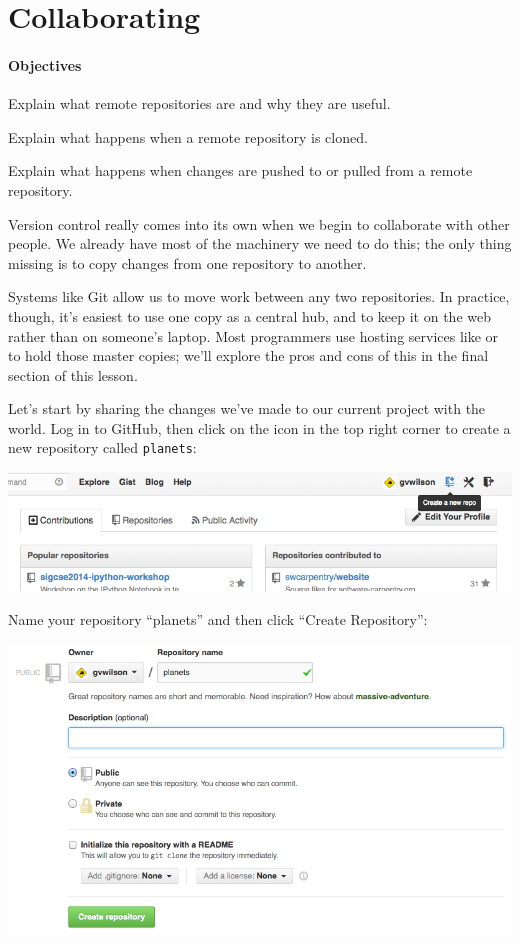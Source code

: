 \documentclass{book}
\begin{document}
\section{Collaborating}

\mbox{}\paragraph{Objectives}

\begin{swcitemize}
\item
  Explain what remote repositories are and why they are useful.
\item
  Explain what happens when a remote repository is cloned.
\item
  Explain what happens when changes are pushed to or pulled from a
  remote repository.
\end{swcitemize}

Version control really comes into its own when we begin to collaborate
with other people. We already have most of the machinery we need to do
this; the only thing missing is to copy changes from one repository to
another.

Systems like Git allow us to move work between any two repositories. In
practice, though, it's easiest to use one copy as a central hub, and to
keep it on the web rather than on someone's laptop. Most programmers use
hosting services like  or
 to hold those master copies;
we'll explore the pros and cons of this in the final section of this
lesson.

Let's start by sharing the changes we've made to our current project
with the world. Log in to GitHub, then click on the icon in the top
right corner to create a new repository called \texttt{planets}:

\includegraphics{novice/git/img/github-create-repo-01.png}

Name your repository ``planets'' and then click ``Create Repository'':

\includegraphics{novice/git/img/github-create-repo-02.png}
\end{document}

